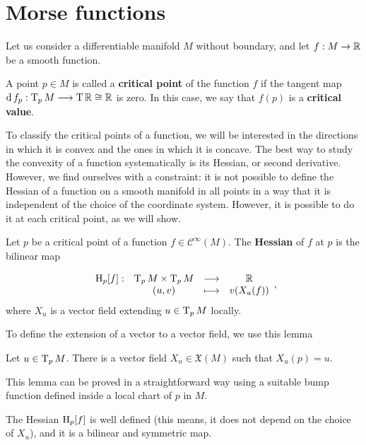 \section{Morse functions} \label{section:morse_functions}

Let us consider a differentiable manifold $M$ without boundary, and let $f : M \rightarrow \mathbb{R}$ be a smooth function.

\begin{deff}
	A point $p \in M$ is called a {\bf critical point} of the function $f$ if the tangent map $\operatorname d f_p : \operatorname T_pM \longrightarrow \operatorname T\mathbb{R} \cong \mathbb{R}$ is zero. In this case, we say that $f(p)$ is a {\bf critical value}.
\end{deff}

To classify the critical points of a function, we will be interested in the directions in which it is convex and the ones in which it is concave. The best way to study the convexity of a function systematically is its Hessian, or second derivative. However, we find ourselves with a constraint: it is not possible to define the Hessian of a function on a smooth manifold in all points in a way that it is independent of the choice of the coordinate system. However, it is possible to do it at each critical point, as we will show.

\begin{deff}
	Let $p$ be a critical point of a function $f \in \mathcal{C}^{\infty}(M)$. The {\bf Hessian} of $f$ at $p$ is the bilinear map

$$\begin{array}{rccc} \operatorname H_p[f] : & \operatorname T_pM \times \operatorname T_pM & \longrightarrow & \mathbb{R} \\ & (u,v) & \longmapsto & v(X_u(f)) \end{array} ,$$
where $X_u$ is a vector field extending $u \in \operatorname T_pM$ locally.
\end{deff}

To define the extension of a vector to a vector field, we use this lemma

\begin{lema}
	Let $u \in \operatorname T_pM$. There is a vector field $X_u \in \mathfrak{X}(M)$ such that $X_u(p) = u$.
\end{lema}

This lemma can be proved in a straightforward way using a suitable bump function defined inside a local chart of $p$ in $M$.

\begin{lema}
	The Hessian $\operatorname H_p[f]$ is well defined (this means, it does not depend on the choice of $X_u$), and it is a bilinear and symmetric map.
\end{lema}

